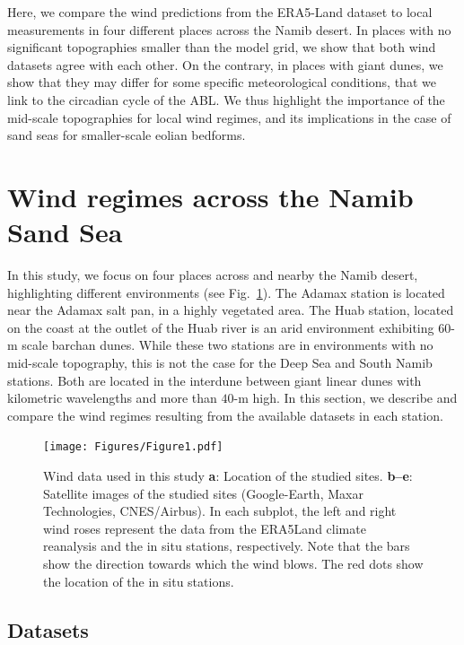 Here, we compare the wind predictions from the ERA5-Land dataset to local measurements in four different places across the Namib desert. In places with no significant topographies smaller than the model grid, we show that both wind datasets agree with each other. On the contrary, in places with giant dunes, we show that they may differ for some specific meteorological conditions, that we link to the circadian cycle of the ABL. We thus highlight the importance of the mid-scale topographies for local wind regimes, and its implications in the case of sand seas for smaller-scale eolian bedforms.


\section{Wind regimes across the Namib Sand Sea}

In this study, we focus on four places across and nearby the Namib desert, highlighting different environments (see Fig.~\ref{Fig1}).
%
The Adamax station is located near the Adamax salt pan, in a highly vegetated area. The Huab station, located on the coast at the outlet of the Huab river is an arid environment exhibiting $60$-m scale barchan dunes. While these two stations are in environments with no mid-scale topography, this is not the case for the Deep Sea and South Namib stations. Both are located in the interdune between giant linear dunes with kilometric wavelengths and more than $40$-m high. In this section, we describe and compare the wind regimes resulting from the available datasets in each station.

  \begin{figure}
    \centering
    \texttt{[image: Figures/Figure1.pdf]}
    \caption{Wind data used in this study \textbf{a}: Location of the studied sites. \textbf{b--e}: Satellite images of the studied sites (Google-Earth, Maxar Technologies, CNES/Airbus). In each subplot, the left and right wind roses represent the data from the ERA5Land climate reanalysis and the in situ stations, respectively. Note that the bars show the direction towards which the wind blows. The red dots show the location of the in situ stations.}
    \label{Fig1}
  \end{figure}

  \subsection{Datasets}

